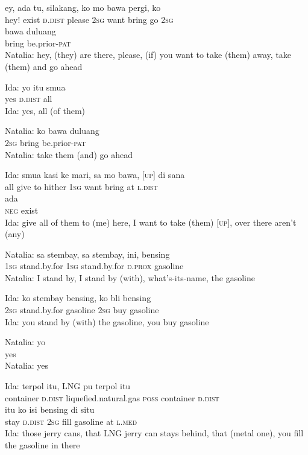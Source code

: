 \ea
{}   ey,   ada   tu,   silakang,   ko   mo   bawa   pergi,   ko\\
   {}   hey!   exist   \textsc{d.dist}   please   \textsc{2sg}   want   bring   go   \textsc{2sg}\\
\gll   bawa    {duluang}\\
  bring    {be.prior-\textsc{pat}}\\
\glt
Natalia: hey, (they) are there, please, (if) you want to take (them) away, take (them) and go ahead
\z

\ea
\gll   Ida:   yo   itu   smua\\
 {}    yes   \textsc{d.dist}   all\\
\glt
Ida: yes, all (of them)
\z

\ea
\gll   Natalia:   ko   bawa   duluang\\
{}     \textsc{2sg}   bring   be.prior-\textsc{pat}\\
\glt
Natalia: take them (and) go ahead
\z

\ea
\gll   Ida:    {smua}   kasi   ke   mari,   sa   mo   bawa,   {\upshape\textsc{[up]}}   di   sana\\
 {}   {all}   give   to   hither   \textsc{1sg}   want   bring   {}    at   \textsc{l.dist}\\
    {ada}\\
   {\textsc{neg}}    {exist}\\
\glt
Ida: give all of them to (me) here, I want to take (them) [\textsc{up}], over there aren’t (any)
\z

\ea
\gll   Natalia:   sa   stembay,   sa   stembay,   ini,   bensing\\
 {}    \textsc{1sg}   stand.by.for   \textsc{1sg}   stand.by.for   \textsc{d.prox}   gasoline\\
\glt
Natalia: I stand by, I stand by (with), what’s-its-name, the gasoline
\z

\ea
\gll   Ida:   ko   stembay   bensing,   ko   bli   bensing\\
 {}  \textsc{2sg}   stand.by.for   gasoline   \textsc{2sg}   buy   gasoline\\
\glt
Ida: you stand by (with) the gasoline, you buy gasoline
\z

\ea
\gll   Natalia:   yo\\
 {} yes\\
\glt
Natalia: yes
\z

\ea
\gll   Ida:    {terpol}    {itu,}    {LNG}   pu   terpol   itu\\
{}   {container}    {\textsc{d.dist}}    {liquefied.natural.gas}   \textsc{poss}   container   \textsc{d.dist}\\
    {itu}   ko    {isi}   bensing   di    {situ}\\
   {stay}    {\textsc{d.dist}}   \textsc{2sg}    {fill}   gasoline   at    {\textsc{l.med}}\\
\glt
Ida: those jerry cans, that LNG jerry can stays behind, that (metal one), you fill the gasoline in there
\z

